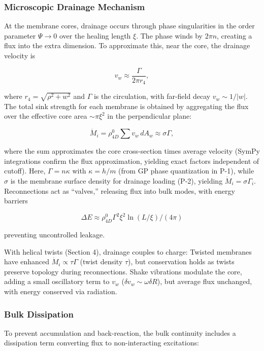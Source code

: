 \subsubsection{Microscopic Drainage Mechanism}
At the membrane cores, drainage occurs through phase singularities in the order parameter $\Psi \to 0$ over the healing length $\xi$. The phase winds by $2\pi n$, creating a flux into the extra dimension. To approximate this, near the core, the drainage velocity is

\begin{equation}
v_w \approx \frac{\Gamma}{2\pi r_4},
\end{equation}

where $r_4 = \sqrt{\rho^2 + w^2}$ and $\Gamma$ is the circulation, with far-field decay $v_w \sim 1/|w|$. The total sink strength for each membrane is obtained by aggregating the flux over the effective core area $\sim \pi \xi^2$ in the perpendicular plane:

\begin{equation}
\dot{M}_i = \rho_{4D}^0 \sum v_w \, dA_w \approx \sigma \Gamma,
\end{equation}

where the sum approximates the core cross-section times average velocity (SymPy integrations confirm the flux approximation, yielding exact factors independent of cutoff). Here, $\Gamma = n \kappa$ with $\kappa = h / m$ (from GP phase quantization in P-1), while $\sigma$ is the membrane surface density for drainage loading (P-2), yielding $\dot{M}_i = \sigma \Gamma_i$. Reconnections act as ``valves,'' releasing flux into bulk modes, with energy barriers

\begin{equation}
\Delta E \approx \rho_{4D}^0 \Gamma^2 \xi^2 \ln(L / \xi) / (4\pi)
\end{equation}

preventing uncontrolled leakage.

With helical twists (Section 4), drainage couples to charge: Twisted membranes have enhanced $\dot{M}_i \propto \tau \Gamma$ (twist density $\tau$), but conservation holds as twists preserve topology during reconnections. Shake vibrations modulate the core, adding a small oscillatory term to $v_w$ ($\delta v_w \sim \omega \delta R$), but average flux unchanged, with energy conserved via radiation.

\subsubsection{Bulk Dissipation}
To prevent accumulation and back-reaction, the bulk continuity includes a dissipation term converting flux to non-interacting excitations:

